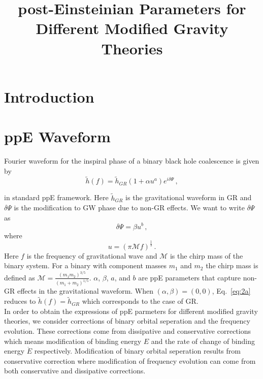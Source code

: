 \documentclass[11pt]{article}
\begin{document}
\title{post-Einsteinian Parameters for Different Modified Gravity Theories}
\maketitle
\section{Introduction}

\section{ppE Waveform}\label{section:ppE}
\hspace*{15.5pt}Fourier waveform for the inspiral phase of a binary black hole coalescence is given by ~\cite{Yunes:2009ke}
\begin{equation}\label{eq:2a}
\tilde{h}(f)=\tilde{h}_{GR}(1+\alpha u^a)e^{i\delta\Psi}\,,
\end{equation}

 
in standard ppE framework. Here $\tilde{h}_{GR}$ is the gravitational waveform in GR and $\delta \Psi$ is the modification to GW phase due to non-GR effects. We want to write $\delta\Psi$ as 
\begin{equation}\label{eq:2b}
\delta\Psi=\beta u^b\,,
\end{equation}
where
\begin{equation}
u=(\pi \mathcal{M} f)^\frac{1}{3}\,.
\end{equation}
Here $f$ is the frequency of gravitational wave and $\mathcal{M}$ is the chirp mass of the binary system. For a binary with component masses $m_1$ and $m_2$ the chirp mass is defined as $\mathcal{M}=\frac{(m_1m_2)^{3/5}}{(m_1+m_2)^{1/5}}$. $\alpha$, $\beta$, $a$, and $b$ are ppE parameters that capture non-GR effects in the gravitational waveform. When $(\alpha,\beta) = (0,0)$, Eq.~\eqref{eq:2a} reduces to $\tilde{h}(f)=\tilde{h}_{GR}$ which corresponds to the case of GR.\\

\hspace{15.5pt} In order to obtain the expressions of ppE parmeters for different modified gravity theories, we consider corrections of binary orbital seperation and the frequency evolution. These corrections come from dissipative and conservative corrections which means modification of binding energy $E$ and the rate of change of binding energy $\dot{E}$ respectively. Modification of binary orbital seperation results from conservative correction where modification of frequency evolution can come from both conservative and dissipative corrections.\\
\end{document}
